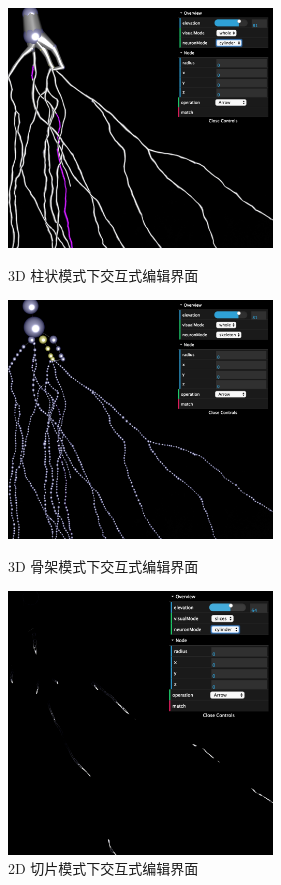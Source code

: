 \begin{figure}[!ht]
\begin{minipage}[t]{0.5\linewidth}
    \centering  
    \includegraphics[width=7cm]{images/cylinder}  
    \caption{3D 柱状模式下交互式编辑界面}
    \label{cylinder}  
    \end{minipage}  
    \begin{minipage}[t]{0.5\linewidth} 
    \centering  
    \includegraphics[width=7cm]{images/skeleton}  
    \caption{3D 骨架模式下交互式编辑界面}  
    \label{skeleton}  
\end{minipage} 
\begin{minipage}[t]{0.5\linewidth}
    \centering  
    \includegraphics[width=7cm]{images/slice}  
    \caption{2D 切片模式下交互式编辑界面}
    \label{slice}  
\end{minipage}   
\end{figure}

